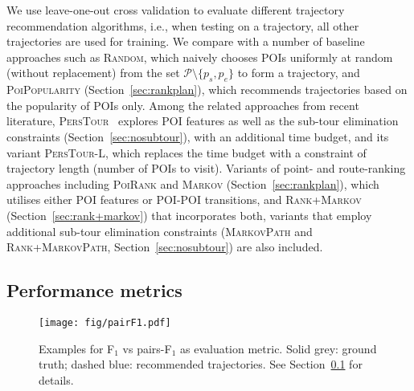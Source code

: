 We use leave-one-out cross validation to evaluate different trajectory recommendation algorithms,
i.e., when testing on a trajectory, all other trajectories are used for training.
We compare with a number of baseline approaches such as \textsc{Random}, 
which naively chooses POIs uniformly at random (without replacement) from the set $\mathcal{P} \setminus \{p_s, p_e \}$ to form a trajectory,
and \textsc{PoiPopularity} (Section~\ref{sec:rankplan}), which recommends trajectories based on the popularity of POIs only.
Among the related approaches from recent literature, 
\textsc{PersTour}~\cite{ijcai15} explores POI features as well as the sub-tour elimination constraints (Section~\ref{sec:nosubtour}), 
with an additional time budget, and its variant \textsc{PersTour-L}, 
which replaces the time budget with a constraint of trajectory length (number of POIs to visit).
Variants of point- and route-ranking approaches including \textsc{PoiRank} and \textsc{Markov} (Section~\ref{sec:rankplan}),
which utilises either POI features or POI-POI transitions,
and \textsc{Rank+Markov} (Section~\ref{sec:rank+markov}) that incorporates both, %
variants that employ additional sub-tour elimination constraints 
(\textsc{MarkovPath} and \textsc{Rank+MarkovPath}, Section~\ref{sec:nosubtour}) are also included.






\subsection{Performance metrics}
\label{sec:metric}
\secmoveup

\begin{figure}[t]
	\centering
	\texttt{[image: fig/pairF1.pdf]}
	\caption{Examples for F$_1$ vs pairs-F$_1$ as evaluation metric. 
Solid grey: ground truth; dashed blue: recommended trajectories. See Section~\ref{sec:metric} for details.}
	\label{fig:pairf1}\captionmoveup
\end{figure}

